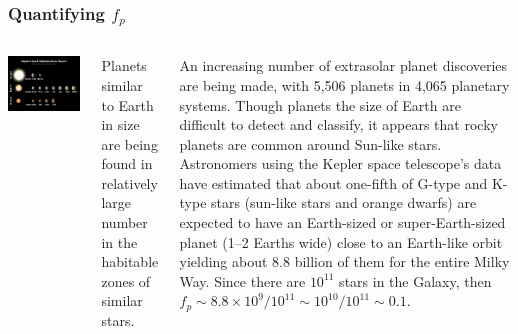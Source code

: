 \begin{frame}

\frametitle{Quantifying $f_p$}

\begin{columns}

\includegraphics[scale=0.30]{exoplanets}

Planets similar to Earth in size are being found in relatively large number in the habitable zones of similar stars. 
 
 An increasing number of extrasolar planet discoveries are being made, with 5,506 planets in 4,065 planetary systems. Though planets the size of Earth are difficult to detect and classify, it appears that rocky planets are common around Sun-like stars. Astronomers using the Kepler space telescope's data have estimated that about one-fifth of G-type and K-type stars (sun-like stars and orange dwarfs) are expected to have an Earth-sized or super-Earth-sized planet (1--2 Earths wide) close to an Earth-like orbit yielding about 8.8 billion of them for the entire Milky Way.  Since there
 are $10^{11}$ stars in the Galaxy, then  
 $f_p  \sim 8.8 \times 10^9/10^{11} \sim 10^{10}/10^{11} \sim 0.1$.
 \end{columns}
\end{frame}

% 
%
%
%
%
%

